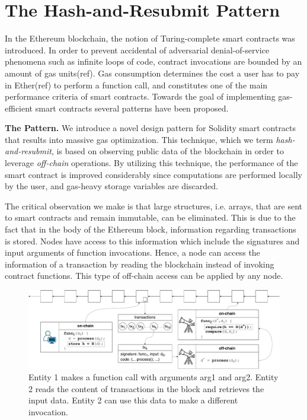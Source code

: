 \section{The Hash-and-Resubmit Pattern}

In the Ethereum blockchain, the notion of Turing-complete smart contracts was
introduced. In order to prevent accidental of adversarial denial-of-service
phenomena such as infinite loops of code, contract invocations are bounded by
an amount of gas units(ref). Gas consumption determines the cost a user has to
pay in Ether(ref) to perform a function call, and constitutes one of the main
performance criteria of smart contracts. Towards the goal of implementing
gas-efficient smart contracts several patterns have been proposed.

\noindent \textbf{The Pattern.} We introduce a novel design pattern for
Solidity smart contracts that results into massive gas optimization. This
technique, which we term \emph{hash-and-resubmit}, is based on observing public
data of the blockchain in order to leverage \emph{off-chain} operations. By
utilizing this technique, the performance of the smart contract is improved
considerably since computations are performed locally by the user, and
gas-heavy storage variables are discarded.

The critical observation we make is that large structures, i.e. arrays, that
are sent to smart contracts and remain immutable, can be eliminated. This is
due to the fact that in the body of the Ethereum block, information regarding
transactions is stored. Nodes have access to this information which include the
signatures and input arguments of function invocations. Hence, a node can
access the information of a transaction by reading the blockchain instead of
invoking contract functions. This type of off-chain access can be applied by
any node.

\begin{figure}[h]
    \begin{center}
        \includegraphics[width=1\columnwidth]{figures/observer-tx.pdf}
    \end{center}
    \caption{Entity 1 makes a function call with arguments arg1 and arg2.
    Entity 2 reads the content of transactions in the block and retrieves the
    input data. Entity 2 can use this data to make a different invocation.}
    \label{fig:observe-tx}
\end{figure}

